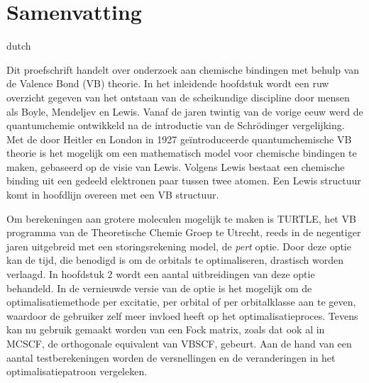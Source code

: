 \chapter*{Samenvatting}
\label{samenvatting}
\fancyhead[RO]{\thepage}
\fancyhead[LE]{\thepage}
\begin{otherlanguage*}{dutch}

Dit proefschrift handelt over onderzoek aan chemische bindingen met behulp van de Valence Bond (VB) theorie. In het inleidende hoofdstuk wordt een ruw overzicht gegeven van het ontstaan van de scheikundige discipline door mensen als Boyle, Mendeljev en Lewis. Vanaf de jaren twintig van de vorige eeuw werd de quantumchemie ontwikkeld na de introductie van de Schr\"{o}dinger vergelijking. Met de door Heitler en London in 1927 ge\"{i}ntroduceerde quantumchemische VB theorie is het mogelijk om een mathematisch model voor chemische bindingen te maken, gebaseerd op de visie van Lewis. Volgens Lewis bestaat een chemische binding uit een gedeeld elektronen paar tussen twee atomen. Een Lewis structuur komt in hoofdlijn overeen met een VB structuur.

Om berekeningen aan grotere moleculen mogelijk te maken is TURTLE, het VB programma van de Theoretische Chemie Groep te Utrecht, reeds in de negentiger jaren uitgebreid met een storingsrekening model, de \textit{pert} optie. Door deze optie kan de tijd, die benodigd is om de orbitals te optimaliseren, drastisch worden verlaagd. In hoofdstuk 2 wordt een aantal uitbreidingen van deze optie behandeld. In de vernieuwde versie van de optie is het mogelijk om de optimalisatiemethode per excitatie, per orbital of per orbitalklasse aan te geven, waardoor de gebruiker zelf meer invloed heeft op het optimalisatieproces. Tevens kan nu gebruik gemaakt worden van een Fock matrix, zoals dat ook al in MCSCF, de orthogonale equivalent van VBSCF, gebeurt. Aan de hand van een aantal testberekeningen worden de versnellingen en de veranderingen in het optimalisatiepatroon vergeleken.


\end{otherlanguage*}
